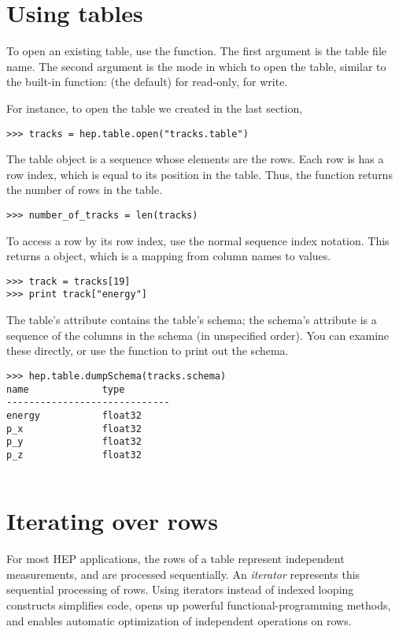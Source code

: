\section{Using tables}

To open an existing table, use the  function.  The first
argument is the table file name.  The second argument is the mode in
which to open the table, similar to the built-in 
function:  (the default) for read-only,  for
write.  

For instance, to open the table we created in the last section,
\begin{verbatim}
>>> tracks = hep.table.open("tracks.table")
\end{verbatim}

The table object is a sequence whose elements are the rows.  Each row is
has a row index, which is equal to its position in the table.  Thus, the
 function returns the number of rows in the table.
\begin{verbatim}
>>> number_of_tracks = len(tracks)
\end{verbatim}
To access a row by its row index, use the normal sequence index
notation.  This returns a  object, which is a mapping from
column names to values.
\begin{verbatim}
>>> track = tracks[19]
>>> print track["energy"]
\end{verbatim}

The table's  attribute contains the table's schema; the
schema's  attribute is a sequence of the columns in the
schema (in unspecified order).  You can examine these directly, or use
the  function to print out the schema.
\begin{verbatim}
>>> hep.table.dumpSchema(tracks.schema)
name             type
-----------------------------
energy           float32
p_x              float32
p_y              float32
p_z              float32
 
\end{verbatim}


\section{Iterating over rows}

For most HEP applications, the rows of a table represent independent
measurements, and are processed sequentially.  An \emph{iterator}
represents this sequential processing of rows.  Using iterators instead
of indexed looping constructs simplifies code, opens up powerful
functional-programming methods, and enables automatic optimization of
independent operations on rows.

